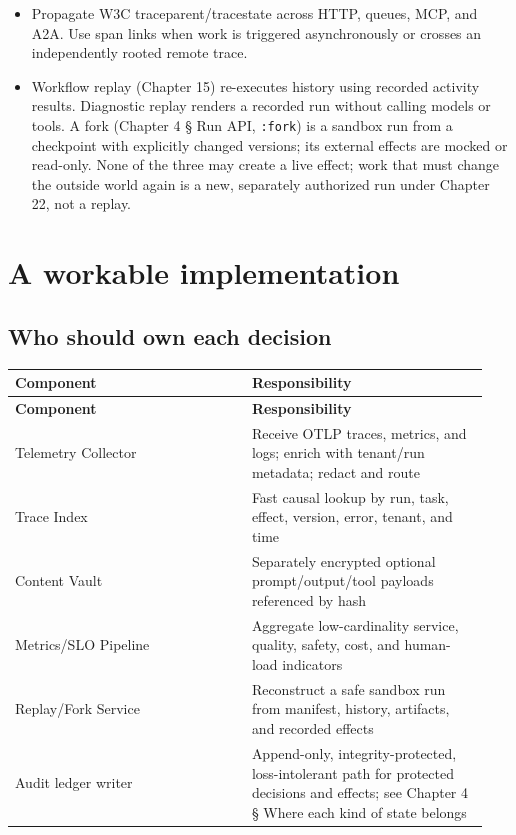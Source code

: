 \begin{itemize}

\item Propagate W3C traceparent/tracestate across HTTP, queues, MCP, and A2A. Use span links when work is triggered asynchronously or crosses an independently rooted remote trace.

\item Workflow replay (Chapter 15) re-executes history using recorded activity results. Diagnostic replay renders a recorded run without calling models or tools. A fork (Chapter 4 § Run API, \lstinline[style=bookinline]!:fork!) is a sandbox run from a checkpoint with explicitly changed versions; its external effects are mocked or read-only. None of the three may create a live effect; work that must change the outside world again is a new, separately authorized run under Chapter 22, not a replay.

\end{itemize}

\section{A workable implementation}

\subsection{Who should own each decision}

\BookTableStart
\small
\begin{longtable}{@{}Y{0.4700\linewidth}Y{0.4700\linewidth}@{}}
\color{white}\bfseries \textbf{Component} & \color{white}\bfseries \textbf{Responsibility} \\
\endfirsthead
{}
\color{white}\bfseries \textbf{Component} & \color{white}\bfseries \textbf{Responsibility} \\
\endhead
Telemetry Collector & Receive OTLP traces, metrics, and logs; enrich with tenant/run metadata; redact and route \\
Trace Index & Fast causal lookup by run, task, effect, version, error, tenant, and time \\
Content Vault & Separately encrypted optional prompt/output/tool payloads referenced by hash \\
Metrics/SLO Pipeline & Aggregate low-cardinality service, quality, safety, cost, and human-load indicators \\
Replay/Fork Service & Reconstruct a safe sandbox run from manifest, history, artifacts, and recorded effects \\
Audit ledger writer & Append-only, integrity-protected, loss-intolerant path for protected decisions and effects; see Chapter 4 § Where each kind of state belongs \\
\end{longtable}
\BookTableEnd

